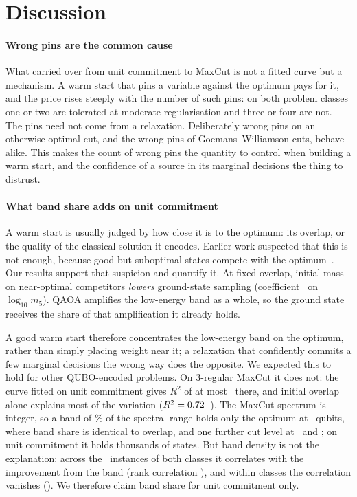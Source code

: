 \section{Discussion}
\label{sec:discussion}

\paragraph{Wrong pins are the common cause} What carried over from unit commitment to MaxCut is not a fitted curve but a mechanism. A warm start that pins a variable against the optimum pays for it, and the price rises steeply with the number of such pins: on both problem classes one or two are tolerated at moderate regularisation and three or four are not. The pins need not come from a relaxation. Deliberately wrong pins on an otherwise optimal cut, and the wrong pins of Goemans--Williamson cuts, behave alike. This makes the count of wrong pins the quantity to control when building a warm start, and the confidence of a source in its marginal decisions the thing to distrust.

\paragraph{What band share adds on unit commitment} A warm start is usually judged by how close it is to the optimum: its overlap, or the quality of the classical solution it encodes. Earlier work suspected that this is not enough, because good but suboptimal states compete with the optimum~\cite{dehn2023hybrid,bhattacharyya2025qubo}. Our results support that suspicion and quantify it. At fixed overlap, initial mass on near-optimal competitors \emph{lowers} ground-state sampling (coefficient \BSCoefBand\ on $\log_{10}m_5$). QAOA amplifies the low-energy band as a whole, so the ground state receives the share of that amplification it already holds.

A good warm start therefore concentrates the low-energy band on the optimum, rather than simply placing weight near it; a relaxation that confidently commits a few marginal decisions the wrong way does the opposite. We expected this to hold for other QUBO-encoded problems. On 3-regular MaxCut it does not: the curve fitted on unit commitment gives $R^2$ of at most \MCTransferSixteen\ there, and initial overlap alone explains most of the variation ($R^2=0.72$--\MCOvTwelve). The MaxCut spectrum is integer, so a band of \BandFivePct\% of the spectral range holds only the optimum at \MCSizeTwelve\ qubits, where band share is identical to overlap, and one further cut level at \MCSizeSixteen\ and \MCSizeTwenty; on unit commitment it holds thousands of states. But band density is not the explanation: across the \BDInstances\ instances of both classes it correlates with the improvement from the band (rank correlation \BDPooled), and within classes the correlation vanishes (\BDWithin). We therefore claim band share for unit commitment only.

